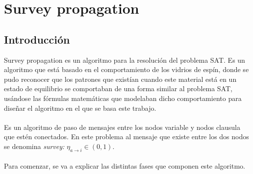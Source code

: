 \section{Survey propagation}
\subsection{Introducción}
Survey propagation es un algoritmo para la resolución del problema SAT.
Es un algoritmo que está basado en el comportamiento de los vidrios de espín, donde se pudo reconocer que los patrones que existían cuando este material está en un estado de equilibrio se comportaban de una forma similar al problema SAT, usándose las fórmulas matemáticas que modelaban dicho comportamiento para diseñar el algoritmo en el que se basa este trabajo.\\\\
Es un algoritmo de paso de mensajes entre los nodos variable y nodos clausula que estén conectados. En este problema al mensaje que existe entre los dos nodos se denomina \textit{survey:} $\eta_{a\rightarrow i} \in (0, 1) $.\\\\
Para comenzar, se va a explicar las distintas fases que componen este algoritmo. 
